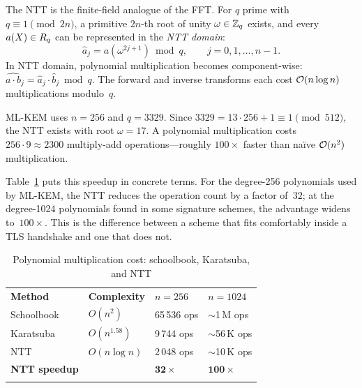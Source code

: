 The NTT is the finite-field analogue of the FFT.  For $q$ prime with $q \equiv 1 \pmod{2n}$, a primitive $2n$-th root of unity $\omega \in \mathbb{Z}_q$ exists, and every $a(X) \in R_q$ can be represented in the \emph{NTT domain}:
\begin{equation}
\hat{a}_j = a(\omega^{2j+1}) \bmod q, \qquad j = 0, 1, \ldots, n-1.
\end{equation}
In NTT domain, polynomial multiplication becomes component-wise: $\widehat{a\cdot b}_j = \hat{a}_j \cdot \hat{b}_j \bmod q$.  The forward and inverse transforms each cost $\mathcal{O}(n \log n)$ multiplications modulo~$q$.

\begin{example}
\label{ex:kyber-ntt}
ML-KEM uses $n = 256$ and $q = 3329$.  Since $3329 = 13\cdot 256 + 1 \equiv 1 \pmod{512}$, the NTT exists with root $\omega = 17$.  A polynomial multiplication costs $256 \cdot 9 \approx 2300$ multiply-add operations---roughly $100\times$ faster than na\"ive $\mathcal{O}(n^2)$ multiplication.
\end{example}

Table~\ref{tab:ntt-speedup} puts this speedup in concrete terms.  For the degree-256 polynomials used by ML-KEM, the NTT reduces the operation count by a factor of~$32$; at the degree-1024 polynomials found in some signature schemes, the advantage widens to~$100\times$.  This is the difference between a scheme that fits comfortably inside a TLS handshake and one that does not.

\begin{table}[t]
\caption{Polynomial multiplication cost: schoolbook, Karatsuba, and NTT}
\label{tab:ntt-speedup}
\begin{tabular}{p{2.5cm}p{2.5cm}p{2.5cm}p{2.5cm}}
\hline\noalign{\smallskip}
\textbf{Method} & \textbf{Complexity} & $n=256$ & $n=1024$ \\
\noalign{\smallskip}\svhline\noalign{\smallskip}
Schoolbook  & $O(n^2)$         & 65\,536 ops  & $\sim$1\,M ops \\
Karatsuba   & $O(n^{1.58})$    & 9\,744 ops   & $\sim$56\,K ops \\
NTT         & $O(n\log n)$     & 2\,048 ops   & $\sim$10\,K ops \\
\noalign{\smallskip}\hline\noalign{\smallskip}
\textbf{NTT speedup} & & $\mathbf{32\times}$ & $\mathbf{100\times}$ \\
\noalign{\smallskip}\hline
\end{tabular}
\end{table}


